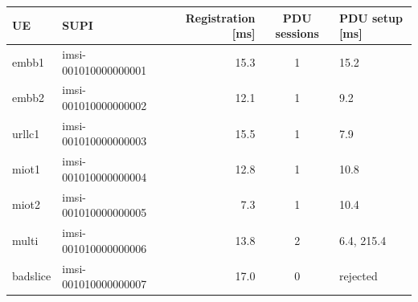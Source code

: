 \begin{tabular}{llrcl}
\toprule
UE & SUPI & Registration [ms] & PDU sessions & PDU setup [ms] \\
\midrule
embb1 & imsi-001010000000001 & 15.3 & 1 & 15.2 \\
embb2 & imsi-001010000000002 & 12.1 & 1 & 9.2 \\
urllc1 & imsi-001010000000003 & 15.5 & 1 & 7.9 \\
miot1 & imsi-001010000000004 & 12.8 & 1 & 10.8 \\
miot2 & imsi-001010000000005 & 7.3 & 1 & 10.4 \\
multi & imsi-001010000000006 & 13.8 & 2 & 6.4, 215.4 \\
badslice & imsi-001010000000007 & 17.0 & 0 & rejected \\
\bottomrule
\end{tabular}
